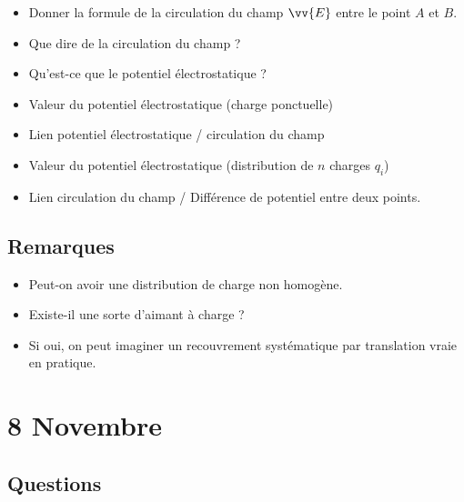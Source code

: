 \documentclass[a4paper, 11pt, hidelinks]{article}
\begin{document}
\begin{itemize}
    \item Donner la formule de la circulation du champ $\vv{E}$ entre le point $A$ et $B$. \cite{Chapitre9}
    \item Que dire de la circulation du champ ? \cite{Chapitre9}
    \item Qu'est-ce que le potentiel électrostatique ? \cite{Chapitre9}
    \item Valeur du potentiel électrostatique (charge ponctuelle) \cite{Chapitre9}
    \item Lien potentiel électrostatique / circulation du champ \cite{Chapitre9}
    \item Valeur du potentiel électrostatique (distribution de $n$ charges $q_i$) \cite{Chapitre9}
    \item Lien circulation du champ / Différence de potentiel entre deux points. \cite{Chapitre9}
\end{itemize}






\subsection{Remarques}
\begin{itemize}
    \item Peut-on avoir une distribution de charge non homogène.
    \item Existe-il une sorte d'aimant à charge ?
    \item Si oui, on peut imaginer un recouvrement systématique par translation vraie en pratique.
\end{itemize}



\section{8 Novembre}

\subsection{Questions}
\end{document}
